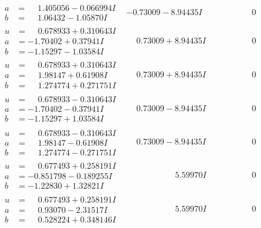 \documentclass[1p]{elsarticle_modified}
\theoremstyle{definition}
\begin{document}
$$\begin{array}{c|c|c}
\begin{aligned}
a &= \phantom{-}1.405056 - 0.066994 I \\
b &= \phantom{-}1.06432 - 1.05870 I\end{aligned}
 & -0.73009 - 8.94435 I & \phantom{-0.000000 } 0 \\ \hline\begin{aligned}
u &= \phantom{-}0.678933 + 0.310643 I \\
a &= -1.70402 + 0.37941 I \\
b &= -1.15297 - 1.03584 I\end{aligned}
 & \phantom{-}0.73009 + 8.94435 I & \phantom{-0.000000 } 0 \\ \hline\begin{aligned}
u &= \phantom{-}0.678933 + 0.310643 I \\
a &= \phantom{-}1.98147 + 0.61908 I \\
b &= \phantom{-}1.274774 + 0.271751 I\end{aligned}
 & \phantom{-}0.73009 + 8.94435 I & \phantom{-0.000000 } 0 \\ \hline\begin{aligned}
u &= \phantom{-}0.678933 - 0.310643 I \\
a &= -1.70402 - 0.37941 I \\
b &= -1.15297 + 1.03584 I\end{aligned}
 & \phantom{-}0.73009 - 8.94435 I & \phantom{-0.000000 } 0 \\ \hline\begin{aligned}
u &= \phantom{-}0.678933 - 0.310643 I \\
a &= \phantom{-}1.98147 - 0.61908 I \\
b &= \phantom{-}1.274774 - 0.271751 I\end{aligned}
 & \phantom{-}0.73009 - 8.94435 I & \phantom{-0.000000 } 0 \\ \hline\begin{aligned}
u &= \phantom{-}0.677493 + 0.258191 I \\
a &= -0.851798 - 0.189255 I \\
b &= -1.22830 + 1.32821 I\end{aligned}
 & \phantom{-0.000000 -}5.59970 I & \phantom{-0.000000 } 0 \\ \hline\begin{aligned}
u &= \phantom{-}0.677493 + 0.258191 I \\
a &= \phantom{-}0.93070 - 2.31517 I \\
b &= \phantom{-}0.528224 + 0.348146 I\end{aligned}
 & \phantom{-0.000000 -}5.59970 I & \phantom{-0.000000 } 0 \\ \hline\begin{aligned}

\end{aligned}
\end{array}$$
\end{document}
